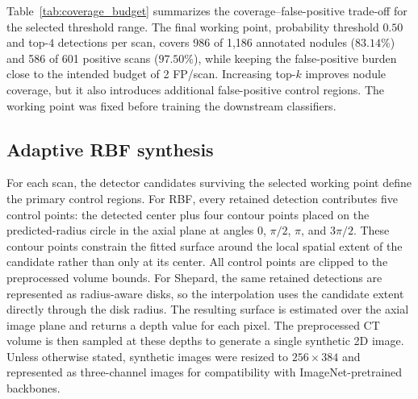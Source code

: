 \documentclass[preprint,12pt]{elsarticle}
\begin{document}
Table~\ref{tab:coverage_budget} summarizes the coverage--false-positive trade-off for the selected threshold range. The final working point, probability threshold $0.50$ and top-$4$ detections per scan, covers 986 of 1,186 annotated nodules ($83.14\%$) and 586 of 601 positive scans ($97.50\%$), while keeping the false-positive burden close to the intended budget of 2 FP/scan. Increasing top-$k$ improves nodule coverage, but it also introduces additional false-positive control regions. The working point was fixed before training the downstream classifiers.

\begin{table}[t]
\centering
\caption{Detector coverage analysis used to select the synthesis working point. Coverage is computed after applying the probability threshold and retaining the top-$k$ detections per scan. A nodule is considered covered when one selected detection center falls inside its annotated radius.}
\label{tab:coverage_budget}
\end{table}

\subsection{Adaptive RBF synthesis}

For each scan, the detector candidates surviving the selected working point define the primary control regions. For RBF, every retained detection contributes five control points: the detected center plus four contour points placed on the predicted-radius circle in the axial plane at angles $0$, $\pi/2$, $\pi$, and $3\pi/2$. These contour points constrain the fitted surface around the local spatial extent of the candidate rather than only at its center. All control points are clipped to the preprocessed volume bounds. For Shepard, the same retained detections are represented as radius-aware disks, so the interpolation uses the candidate extent directly through the disk radius. The resulting surface is estimated over the axial image plane and returns a depth value for each pixel. The preprocessed CT volume is then sampled at these depths to generate a single synthetic 2D image. Unless otherwise stated, synthetic images were resized to $256 \times 384$ and represented as three-channel images for compatibility with ImageNet-pretrained backbones.
\end{document}
